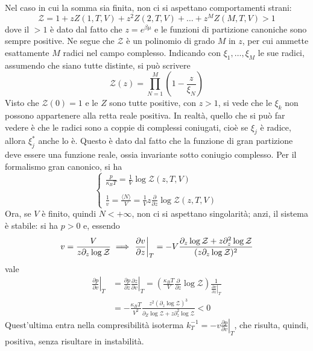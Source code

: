 \documentclass[11pt, a4paper]{scrartcl}
\theoremstyle{style}
\theoremstyle{style1}
\newcommand*\Eval[3]{\left.#1\right\rvert_{#2}^{#3}}
\numberwithin{equation}{subsection}
\begin{document}
Nel caso in cui la somma sia finita, non ci si aspettano comportamenti strani:
\[
\mathcal{Z} = 1+zZ(1,T,V) + z^2 Z(2,T,V) + \ldots + z^M Z(M,T,V) > 1
\] 
dove il $>1$ \`e dato dal fatto che $z=e^{\beta \mu }$ e le funzioni di partizione canoniche sono sempre positive.
Ne segue che $\mathcal{Z} $ \`e un polinomio di grado $M$ in $z$, per cui ammette esattamente $M$ radici nel campo complesso.
Indicando con $\xi _1,\ldots,\xi _M$ le sue radici, assumendo che siano tutte distinte, si pu\`o scrivere 
\[
\mathcal{Z} (z) = \prod_{N=1} ^M \left(1-\frac{z}{\xi _N}\right) 
\] 
Visto che $\mathcal{Z} (0) = 1$ e le $Z$ sono tutte positive, con $z>1$, si vede che le $\xi _k$ non possono appartenere alla retta reale positiva.
In realt\`a, quello che si pu\`o far vedere \`e che le radici sono a coppie di complessi coniugati, cio\`e se $\xi _j$ \`e radice, allora $\xi _j^*$ anche lo \`e.
Questo \`e dato dal fatto che la funzione di gran partizione deve essere una funzione reale, ossia invariante sotto coniugio complesso. 
Per il formalismo gran canonico, si ha
\[
\begin{cases}
	\displaystyle \frac{p}{\kappa _B T} = \frac{1}{V}\log\mathcal{Z} (z,T,V)\\
	\\
	\displaystyle \frac{1}{v}= \frac{\langle N \rangle}{V}=\frac{1}{V}z\frac{\partial }{\partial z} \log\mathcal{Z} (z,T,V)
\end{cases}
\] 
Ora, se $V$ \`e finito, quindi $N<+\infty$, non ci si aspettano singolarit\`a; anzi, il sistema \`e stabile: si ha $p>0$ e, essendo
\[
v = \frac{V}{z \partial _z \log\mathcal{Z} } \implies \Eval{\frac{\partial v}{\partial z} }{T}{} = -V \frac{\partial _z \log\mathcal{Z} + z \partial _z^2 \log\mathcal{Z} }{(z\partial _z\log\mathcal{Z} )^2}\\
\] 
vale
\[
	\begin{split}
		\Eval{\frac{\partial p}{\partial v} }{T}{} &=  \Eval{\frac{\partial p}{\partial z} \frac{\partial z}{\partial v} }{T}{} = \left(\frac{\kappa _B T}{V}\frac{\partial }{\partial z} \log\mathcal{Z} \right) \frac{1}{\Eval{\frac{\partial v}{\partial z} }{T}{}}\\
							   &= -\frac{\kappa _B T}{V^2}\frac{z^2 \left(\partial _z\log\mathcal{Z} \right) ^3}{\partial _Z \log\mathcal{Z} +z \partial _z^2 \log\mathcal{Z} } < 0
	\end{split}
\] 
Quest'ultima entra nella compresibilit\`a isoterma $k_T ^{-1} = - v \Eval{\frac{\partial p}{\partial v} }{T}{}$, che risulta, quindi, positiva, senza risultare in instabilit\`a.
\end{document}
